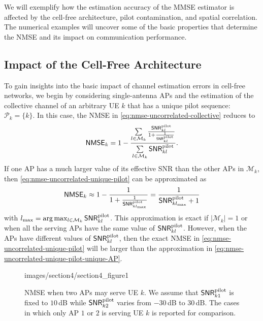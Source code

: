 We will exemplify how the estimation accuracy of the MMSE estimator is affected by the cell-free architecture, pilot contamination, and spatial correlation. The numerical examples will uncover some of the basic properties that determine the NMSE and its impact on communication performance. 

\enlargethispage{\baselineskip}

\subsection{Impact of the Cell-Free Architecture}

To gain insights into the basic impact of channel estimation errors in cell-free networks, we begin by considering  single-antenna APs and the estimation of the collective channel of an arbitrary UE $k$ that has a unique pilot sequence: $\mathcal{P}_k = \{k\}$. In this case, the NMSE in \eqref{eq:nmse-uncorrelated-collective} reduces to
\begin{align}
\mathsf{NMSE}_{k}=1 - \frac{\sum\limits_{l \in \mathcal{M}_k} \frac{ \mathsf{SNR}_{kl}^{\text{pilot}}}{1+\frac{1}{\mathsf{SNR}_{kl}^{\text{pilot}}}}}{\sum\limits_{l \in \mathcal{M}_k}  \mathsf{SNR}_{kl}^{\text{pilot}}}.\label{eq:nmse-uncorrelated-unique-pilot}
\end{align}
If one AP has a much larger value of its effective SNR than the other APs in $\mathcal{M}_k$, then \eqref{eq:nmse-uncorrelated-unique-pilot} can be approximated as
\begin{align}
\mathsf{NMSE}_{k}\approx 1 - \frac{1}{1+\frac{1}{\mathsf{SNR}_{kl_{\max} }^{\text{pilot}}}}
 = \frac{1}{\mathsf{SNR}_{kl_{\max} }^{\text{pilot}} +1}
\label{eq:nmse-uncorrelated-unique-pilot-unique-AP}
\end{align}
with $l_{\max} = \arg \max_{l \in \mathcal{M}_k} \mathsf{SNR}_{kl}^{\text{pilot}}$. This approximation is exact if
$|\mathcal{M}_k|=1$ or when all the serving APs have the same value of $\mathsf{SNR}_{kl}^{\text{pilot}}$. However, when the APs have different values of $\mathsf{SNR}_{kl}^{\text{pilot}}$, then the exact NMSE in \eqref{eq:nmse-uncorrelated-unique-pilot} will be larger than the approximation in \eqref{eq:nmse-uncorrelated-unique-pilot-unique-AP}.

\begin{figure}[t!]
	\begin{overpic}[width=\columnwidth,tics=10]{images/section4/section4_figure1}
\end{overpic} 
                \caption{NMSE when two APs may serve UE $k$. We assume that $\mathsf{SNR}_{k1}^{\text{pilot}}$ is fixed to $10$\,dB while $\mathsf{SNR}_{k2}^{\text{pilot}}$ varies from $-30$\,dB to $30$\,dB. The cases in which only AP $1$ or $2$ is serving UE $k$ is reported for comparison.}    \vspace{+2mm}
	\label{fig:basic-NMSE-analysis-twoAPs} 
\end{figure}

